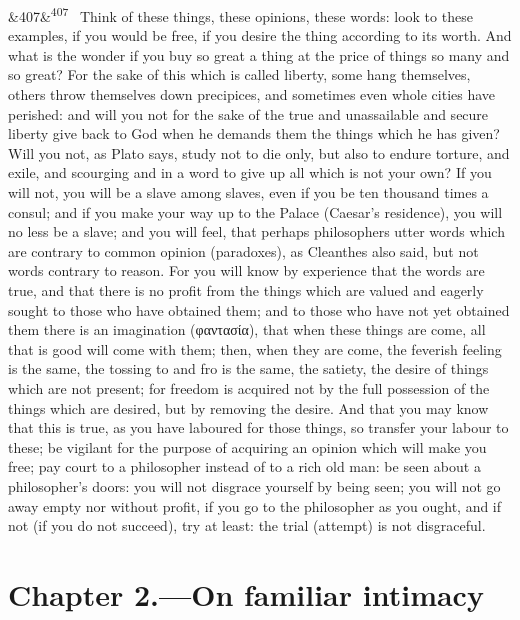 \documentclass[12pt]{article}
\newcommand{\para}[1][]{\par\noindent\ifx&#1&\else\textsuperscript{\footnotesize #1}~\fi}
\begin{document}
\para[407] Think of these things, these opinions, these words: look to these examples, if you would be free, if you desire the thing according to its worth. And what is the wonder if you buy so great a thing at the price of things so many and so great? For the sake of this which is called liberty, some hang themselves, others throw themselves down precipices, and sometimes even whole cities have perished: and will you not for the sake of the true and unassailable and secure liberty give back to God when he demands them the things which he has given? Will you not, as Plato says, study not to die only, but also to endure torture, and exile, and scourging and in a word to give up all which is not your own? If you will not, you will be a slave among slaves, even if you be ten thousand times a consul; and if you make your way up to the Palace (Caesar's residence), you will no less be a slave; and you will feel, that perhaps philosophers utter words which are contrary to common opinion (paradoxes), as Cleanthes also said, but not words contrary to reason. For you will know by experience that the words are true, and that there is no profit from the things which are valued and eagerly sought to those who have obtained them; and to those who have not yet obtained them there is an imagination (φαντασία), that when these things are come, all that is good will come with them; then, when they are come, the feverish feeling is the same, the tossing to and fro is the same, the satiety, the desire of things which are not present; for freedom is acquired not by the full possession of the things which are desired, but by removing the desire. And that you may know that this is true, as you have laboured for those things, so transfer your labour to these; be vigilant for the purpose of acquiring an opinion which will make you free; pay court to a philosopher instead of to a rich old man: be seen about a philosopher's doors: you will not disgrace yourself by being seen; you will not go away empty nor without profit, if you go to the philosopher as you ought, and if not (if you do not succeed), try at least: the trial (attempt) is not disgraceful.

\section*{Chapter 2.---On familiar intimacy}
\end{document}
